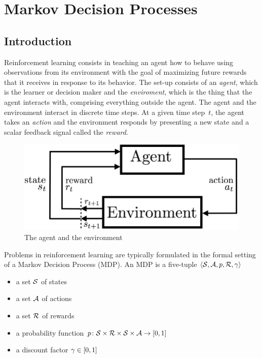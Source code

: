 \chapter{Markov Decision Processes}

\section{Introduction}
Reinforcement learning consists in teaching an agent how to behave using 
observations from its environment with the goal of maximizing 
future rewards that it receives in response to its behavior. 
The set-up consists of an \emph{agent}, 
which is the learner or decision maker and the \emph{enviroment}, which is 
the thing that the agent interacts with, comprising everything outside the agent. 
The agent and the environment interact in discrete time steps. At a given time 
step~$t$, the agent takes an \emph{action} and the environment responds by 
presenting a new state and a scalar feedback signal called the \emph{reward}.

\begin{figure}[h]
\begin{center}
    \includegraphics[scale=0.3]{RLAgentEnvironment.png}
\end{center}   
\caption{The agent and the environment}
\end{figure}


Problems in reinforcement learning are typically formulated in the formal
setting of a Markov Decision Process (MDP). An MDP is a five-tuple
$\left \langle \mathcal{S}, \mathcal{A}, p, \mathcal{R}, \gamma \right \rangle$
\begin{itemize}
    \item a set $\mathcal{S}$ of states
    \item a set $\mathcal{A}$ of actions
    \item a set $\mathcal{R}$ of rewards
    \item a probability function
        $p \colon \mathcal{S} \times \mathcal{R} \times \mathcal{S} \times \mathcal{A} \rightarrow [0, 1]$
    \item a discount factor $\gamma \in [0, 1]$
\end{itemize}

